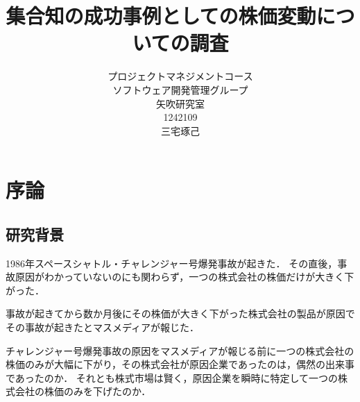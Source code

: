 \usepackage{here}
\usepackage{listings}
\usepackage{color}



\title{集合知の成功事例としての株価変動についての調査}
\author{プロジェクトマネジメントコース\\
ソフトウェア開発管理グループ\\
矢吹研究室\\
1242109\\
三宅琢己}
\date{}

\maketitle


\tableofcontents%
\chapter{序論}

\section{研究背景}

1986年スペースシャトル・チャレンジャー号爆発事故が起きた．
その直後，事故原因がわかっていないのにも関わらず，一つの株式会社の株価だけが大きく下がった．

事故が起きてから数か月後にその株価が大きく下がった株式会社の製品が原因でその事故が起きたとマスメディアが報じた\cite{miyake2}．

チャレンジャー号爆発事故の原因をマスメディアが報じる前に一つの株式会社の株価のみが大幅に下がり，その株式会社が原因企業であったのは，偶然の出来事であったのか．
それとも株式市場は賢く，原因企業を瞬時に特定して一つの株式会社の株価のみを下げたのか．


